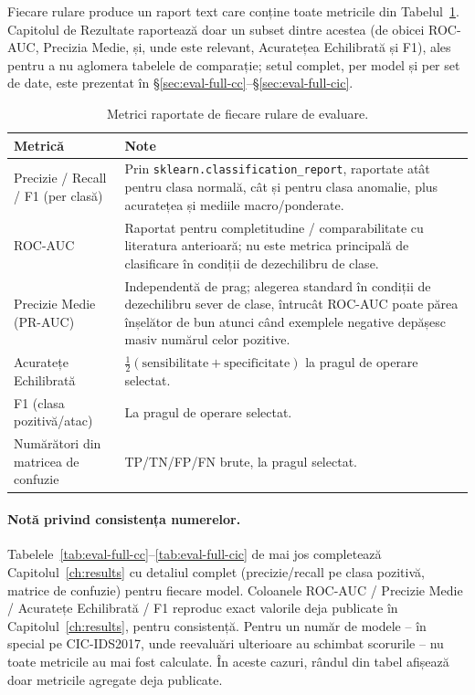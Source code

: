 Fiecare rulare produce un raport text care conține toate metricile din Tabelul~\ref{tab:eval-metrics-def}. Capitolul de Rezultate raportează doar un subset dintre acestea (de obicei ROC-AUC, Precizia Medie, și, unde este relevant, Acuratețea Echilibrată și F1), ales pentru a nu aglomera tabelele de comparație; setul complet, per model și per set de date, este prezentat în \S\ref{sec:eval-full-cc}--\S\ref{sec:eval-full-cic}.

\begin{table}[H]
\centering
\begin{tabular}{@{}p{4cm}p{9.5cm}@{}}
\toprule
Metrică & Note \\
\midrule
Precizie / Recall / F1 (per clasă) & Prin \texttt{sklearn.classification\_report}, raportate atât pentru clasa normală, cât și pentru clasa anomalie, plus acuratețea și mediile macro/ponderate. \\
ROC-AUC & Raportat pentru completitudine / comparabilitate cu literatura anterioară; nu este metrica principală de clasificare în condiții de dezechilibru de clase. \\
Precizie Medie (PR-AUC) & Independentă de prag; alegerea standard în condiții de dezechilibru sever de clase, întrucât ROC-AUC poate părea înșelător de bun atunci când exemplele negative depășesc masiv numărul celor pozitive. \\
Acuratețe Echilibrată & $\frac{1}{2}(\text{sensibilitate} + \text{specificitate})$ la pragul de operare selectat. \\
F1 (clasa pozitivă/atac) & La pragul de operare selectat. \\
Numărători din matricea de confuzie & TP/TN/FP/FN brute, la pragul selectat. \\
\bottomrule
\end{tabular}
\caption{Metrici raportate de fiecare rulare de evaluare.}
\label{tab:eval-metrics-def}
\end{table}

\paragraph{Notă privind consistența numerelor.} Tabelele~\ref{tab:eval-full-cc}--\ref{tab:eval-full-cic} de mai jos completează Capitolul~\ref{ch:results} cu detaliul complet (precizie/recall pe clasa pozitivă, matrice de confuzie) pentru fiecare model. 
Coloanele ROC-AUC / Precizie Medie / Acuratețe Echilibrată / F1 reproduc exact valorile deja publicate în Capitolul~\ref{ch:results}, pentru consistență. Pentru un număr de modele -- în special pe CIC-IDS2017, unde reevaluări ulterioare au schimbat scorurile -- nu toate metricile au mai fost calculate. În aceste cazuri, rândul din tabel afișează doar metricile agregate deja publicate.

